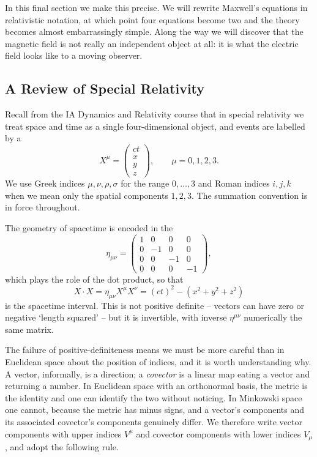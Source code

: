 \documentclass[a4paper]{scrartcl}
\begin{document}
In this final section we make this precise. We will rewrite Maxwell's equations in relativistic notation, at which point four equations become two and the theory becomes almost embarrassingly simple. Along the way we will discover that the magnetic field is not really an independent object at all: it is what the electric field looks like to a moving observer.

\subsection{A Review of Special Relativity}

Recall from the IA Dynamics and Relativity course that in special relativity we treat space and time as a single four-dimensional object, and events are labelled by a 
$$
X^\mu = \begin{pmatrix} ct \\ x\\ y\\ z\end{pmatrix}, \qquad \mu = 0,1,2,3.
$$
We use Greek indices $\mu,\nu,\rho,\sigma$ for the range $0,\dots,3$ and Roman indices $i,j,k$ when we mean only the spatial components $1,2,3$. The summation convention is in force throughout.

The geometry of spacetime is encoded in the 
$$
\eta_{\mu\nu} = \begin{pmatrix} 1&0&0&0\\ 0&-1&0&0\\ 0&0&-1&0\\0&0&0&-1\end{pmatrix},
$$
which plays the role of the dot product, so that
$$
X\cdot X = \eta_{\mu\nu}X^\mu X^\nu = (ct)^2 - (x^2+y^2+z^2)
$$
is the spacetime interval. This is not positive definite -- vectors can have zero or negative `length squared' -- but it is invertible, with inverse $\eta^{\mu\nu}$ numerically the same matrix.

The failure of positive-definiteness means we must be more careful than in Euclidean space about the position of indices, and it is worth understanding why. A vector, informally, is a direction; a \emph{covector} is a linear map eating a vector and returning a number. In Euclidean space with an orthonormal basis, the metric is the identity and one can identify the two without noticing. In Minkowski space one cannot, because the metric has minus signs, and a vector's components and its associated covector's components genuinely differ. We therefore write vector components with upper indices $V^\mu$ and covector components with lower indices $V_\mu$, and adopt the following rule.
\end{document}
